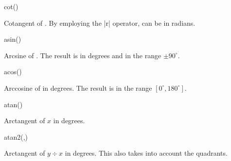\begin{math-function}{cot()}
\mathcommand

	Cotangent of . By employing the |r| operator,  can be in
	radians.
	
\begin{codeexample}[]
 \pgfmathresult
\end{codeexample}

\end{math-function}

\begin{math-function}{asin()}
\mathcommand

	Arcsine of . The result is in degrees and in the range $\pm90^\circ$.

\begin{codeexample}[]
 \pgfmathresult
\end{codeexample}

\end{math-function}

\begin{math-function}{acos()}
\mathcommand

	Arccosine of  in degrees. The result is in the range $[0^\circ,180^\circ]$.

\begin{codeexample}[]
 \pgfmathresult
\end{codeexample}

\end{math-function}

\begin{math-function}{atan()}
\mathcommand

	Arctangent of $x$ in degrees.

\begin{codeexample}[]
 \pgfmathresult
\end{codeexample}

\end{math-function}

\begin{math-function}{atan2(,)}

	Arctangent of $y\div x$ in degrees. This also takes into account the
	quadrants.

\begin{codeexample}[]
 \pgfmathresult
\end{codeexample}

\end{math-function}

